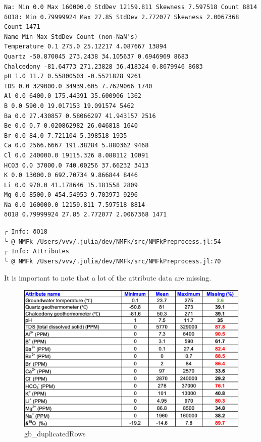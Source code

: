 \documentclass[11pt]{article}
\begin{document}
    \begin{Verbatim}[commandchars=\\\{\}]
Na: Min 0.0 Max 160000.0 StdDev 12159.811 Skewness 7.597518 Count 8814
δO18: Min 0.79999924 Max 27.85 StdDev 2.772077 Skewness 2.0067368 Count 1471
Name Min Max StdDev Count (non-NaN's)
Temperature 0.1 275.0 25.12217 4.087667 13894
Quartz -50.870045 273.2438 34.105637 0.6946969 8683
Chalcedony -81.64773 271.23828 36.418324 0.8679946 8683
pH 1.0 11.7 0.55800503 -0.5521828 9261
TDS 0.0 329000.0 34939.605 7.7629066 1740
Al 0.0 6400.0 175.44391 35.600906 1362
B 0.0 590.0 19.017153 19.091574 5462
Ba 0.0 27.430857 0.58066297 41.943157 2516
Be 0.0 0.7 0.020862982 26.046818 1640
Br 0.0 84.0 7.721104 5.398518 1935
Ca 0.0 2566.6667 191.38284 5.880362 9468
Cl 0.0 240000.0 19115.326 8.088112 10091
HCO3 0.0 37000.0 740.00256 37.66232 3413
K 0.0 13000.0 692.70734 9.866844 8446
Li 0.0 970.0 41.178646 15.181558 2809
Mg 0.0 8500.0 454.54953 9.703973 9296
Na 0.0 160000.0 12159.811 7.597518 8814
δO18 0.79999924 27.85 2.772077 2.0067368 1471
    \end{Verbatim}

    \begin{Verbatim}[commandchars=\\\{\}]
┌ Info: δO18
└ @ NMFk /Users/vvv/.julia/dev/NMFk/src/NMFkPreprocess.jl:54
┌ Info: Attributes
└ @ NMFk /Users/vvv/.julia/dev/NMFk/src/NMFkPreprocess.jl:70
    \end{Verbatim}

    It is important to note that a lot of the attribute data are missing.

\begin{figure}
\centering
\includegraphics{../data/gb_duplicatedRows.png}
\caption{gb\_duplicatedRows}
\end{figure}
\end{document}
